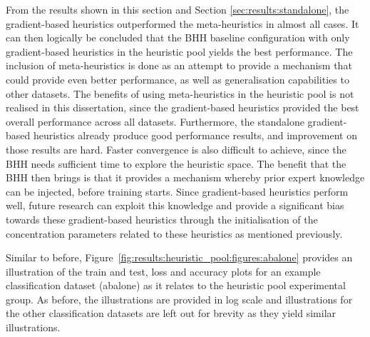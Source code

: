 From the results shown in this section and Section \ref{sec:results:standalone}, the gradient-based heuristics outperformed the meta-heuristics in almost all cases. It can then logically be concluded that the \acs{BHH} baseline configuration with only gradient-based heuristics in the heuristic pool yields the best performance. The inclusion of meta-heuristics is done as an attempt to provide a mechanism that could provide even better performance, as well as generalisation capabilities to other datasets. The benefits of using meta-heuristics in the heuristic pool is not realised in this dissertation, since the gradient-based heuristics provided the best overall performance across  all datasets. Furthermore, the standalone gradient-based heuristics already produce good performance results, and improvement on those results are hard. Faster convergence is also difficult to achieve, since the \acs{BHH} needs sufficient time to explore the heuristic space. The benefit that the \acs{BHH} then brings is that it provides a mechanism whereby prior expert knowledge can be injected, before training starts. Since gradient-based heuristics perform well, future research can exploit this knowledge and provide a significant bias towards these gradient-based heuristics through the initialisation of the concentration parameters related to these heuristics as mentioned previously.

Similar to before, Figure~\ref{fig:results:heuristic_pool:figures:abalone} provides an illustration of the train and test, loss and accuracy plots for an example classification dataset (abalone) as it relates to the heuristic pool experimental group. As before, the illustrations are provided in log scale and illustrations for the other classification datasets are left out for brevity as they yield similar illustrations.

